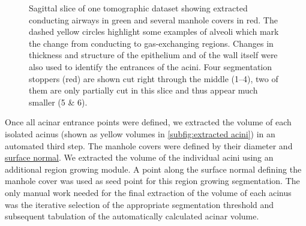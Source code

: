 \documentclass[a4paper,DIV=calc,abstract,english]{scrartcl}
\newlength\imagescale		%
\begin{document}
\begin{figure}
%
	\caption{Sagittal slice of one tomographic dataset showing extracted conducting airways in green and several manhole covers in red.
		The dashed yellow circles highlight some examples of alveoli which mark the change from conducting to gas-exchanging regions.
		Changes in thickness and structure of the epithelium and of the wall itself were also used to identify the entrances of the acini.
		Four segmentation stoppers (red) are shown cut right through the middle (\numrange{1}{4}), two of them are only partially cut in this slice and thus appear much smaller (5 \& 6).}
	\label{fig:ManholeCoverExplanation}
\end{figure}

Once all acinar entrance points were defined, we extracted the volume of each isolated acinus (shown as yellow volumes in \autoref{subfig:extracted acini}) in an automated third step.
The manhole covers were defined by their diameter and \href{https://secure.wikimedia.org/wikipedia/en/w/index.php?title=Surface_normal&oldid=411684319}{surface normal}.
We extracted the volume of the individual acini using an additional region growing module.
A point along the surface normal defining the manhole cover was used as seed point for this region growing segmentation.
The only manual work needed for the final extraction of the volume of each acinus was the iterative selection of the appropriate segmentation threshold and subsequent tabulation of the automatically calculated acinar volume.
\end{document}
